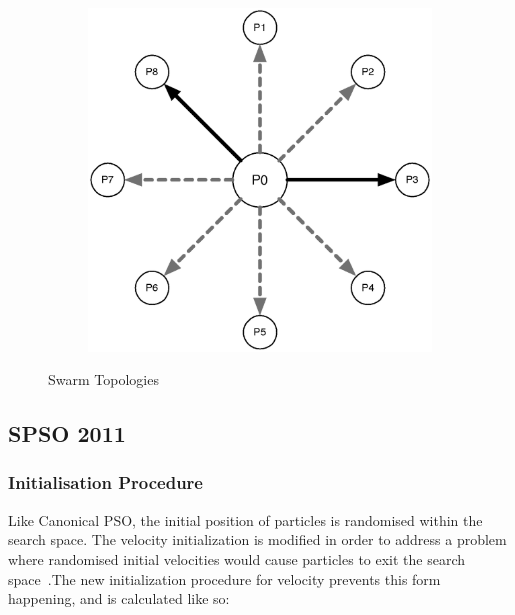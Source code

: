 \documentclass{csfourzero}
\begin{document}
\begin{figure}
\begin{subfigure}[b]{0.3\textwidth}
    \label{fig:ring_topology}
  \end{subfigure}
  ~
  \begin{subfigure}[b]{0.3\textwidth}
    \includegraphics[width=\textwidth]{star_topology.eps}
    \label{fig:adaptive_random_topology}
  \end{subfigure}
  \caption{Swarm Topologies}
  \label{fig:swarm_topology}
\end{figure}

\subsection{SPSO 2011}

\subsubsection{Initialisation Procedure}

Like Canonical PSO, the initial position of particles is randomised within the
search space. The velocity initialization is modified in order to address a
problem where randomised initial velocities would cause particles to exit the
search space~\cite{Helwig:2008bl}.The new initialization procedure for velocity
prevents this form happening, and is calculated like so:
\end{document}
